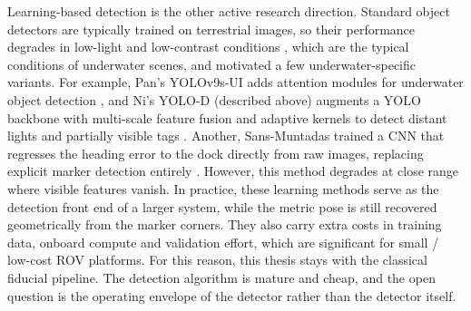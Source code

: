 Learning-based detection is the other active research direction. Standard object detectors are typically trained on terrestrial images, so their performance degrades in low-light and low-contrast conditions \cite{DAS20253042}, which are the typical conditions of underwater scenes, and motivated a few underwater-specific variants. For example, Pan's YOLOv9s-UI adds attention modules for underwater object detection \cite{app14167162}, and Ni's YOLO-D (described above) augments a YOLO backbone with multi-scale feature fusion and adaptive kernels to detect distant lights and partially visible tags \cite{ni2025vision}. Another, Sans-Muntadas trained a CNN that regresses the heading error to the dock directly from raw images, replacing explicit marker detection entirely \cite{sans2019learning}. However, this method degrades at close range where visible features vanish. In practice, these learning methods serve as the detection front end of a larger system, while the metric pose is still recovered geometrically from the marker corners. They also carry extra costs in training data, onboard compute and validation effort, which are significant for small / low-cost ROV platforms. For this reason, this thesis stays with the classical fiducial pipeline. The detection algorithm is mature and cheap, and the open question is the operating envelope of the detector rather than the detector itself.
